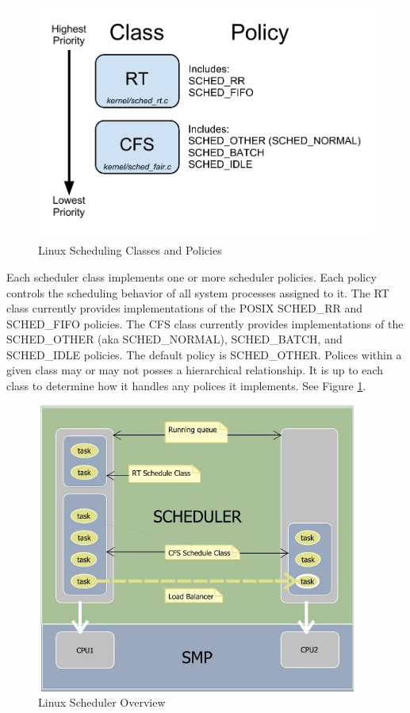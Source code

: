 \documentclass[12pt]{article}
\begin{document}
\begin{figure}[htbp]
  \begin{center}
    \includegraphics[scale=.9]{LinuxSchedulingClass.pdf}
    \caption{Linux Scheduling Classes and Policies}
    \label{fig:LSClasses}
  \end{center}
\end{figure}

Each scheduler class implements one or more scheduler policies. Each
policy controls the scheduling behavior of all system processes
assigned to it. The RT class currently provides implementations of the
POSIX SCHED\_RR and SCHED\_FIFO policies. The CFS class currently
provides implementations of the SCHED\_OTHER (aka SCHED\_NORMAL),
SCHED\_BATCH, and SCHED\_IDLE policies. The default policy is
SCHED\_OTHER. Polices within a given class may or may not posses a
hierarchical relationship. It is up to each class to determine how it
handles any polices it implements. See Figure \ref{fig:LSClasses}. 

\begin{figure}[htbp]
  \begin{center}
    \includegraphics[scale=.75]{LinuxSchedulerOverview.jpg}
    \caption{Linux Scheduler Overview \cite{Le-StudyLKS}}
    \label{fig:LSOverview}
  \end{center}
\end{figure}
\end{document}
